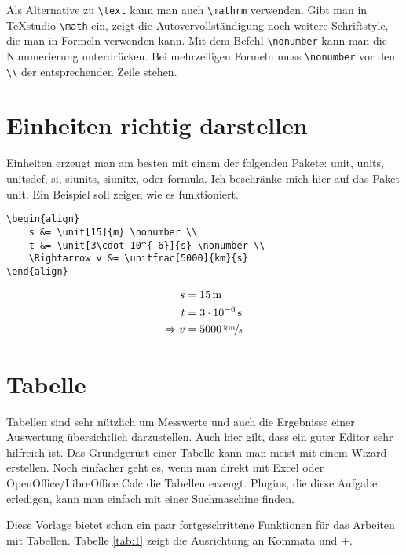 Als Alternative zu \verb|\text| kann man auch \verb|\mathrm| verwenden. Gibt man in TeXstudio \verb|\math| ein, zeigt die Autovervollständigung noch weitere Schriftstyle, die man in Formeln verwenden kann. Mit dem Befehl \verb|\nonumber| kann man die Nummerierung unterdrücken. Bei mehrzeiligen Formeln muss \verb|\nonumber| vor den \verb|\\| der entsprechenden Zeile stehen.

\section{Einheiten richtig darstellen}

Einheiten erzeugt man am besten mit einem der folgenden Pakete: unit, units, unitsdef, si, siunits, siunitx, oder formula. Ich beschränke mich hier auf das Paket unit. Ein Beispiel soll zeigen wie es funktioniert.

\begin{verbatim}
\begin{align}
    s &= \unit[15]{m} \nonumber \\
    t &= \unit[3\cdot 10^{-6}]{s} \nonumber \\
    \Rightarrow v &= \unitfrac[5000]{km}{s}
\end{align}
\end{verbatim}

\begin{align}
    s &= \unit[15]{m} \nonumber \\
    t &= \unit[3\cdot 10^{-6}]{s} \nonumber \\
    \Rightarrow v &= \unitfrac[5000]{km}{s}
\end{align}

\section{Tabelle}

Tabellen sind sehr nützlich um Messwerte und auch die Ergebnisse einer Auswertung übersichtlich darzustellen. Auch hier gilt, dass ein guter Editor sehr hilfreich ist. Das Grundgerüst einer Tabelle kann man meist mit einem Wizard erstellen. Noch einfacher geht es, wenn man direkt mit Excel oder OpenOffice/LibreOffice Calc die Tabellen erzeugt. Plugins, die diese Aufgabe erledigen, kann man einfach mit einer Suchmaschine finden.

Diese Vorlage bietet schon ein paar fortgeschrittene Funktionen für das Arbeiten mit Tabellen. Tabelle \ref{tab:1} zeigt die Ausrichtung an Kommata und $\pm$.

